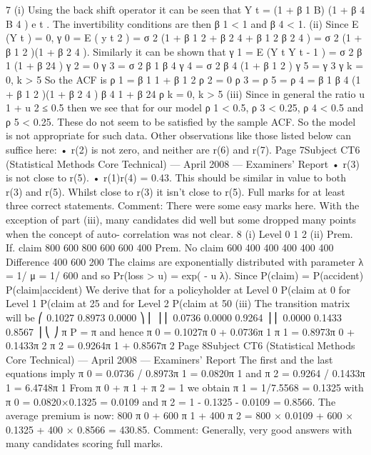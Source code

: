 7
(i)
Using the back shift operator it can be seen that
Y t = (1 + β 1 B) (1 + β 4 B 4 ) e t .
The invertibility conditions are then β 1 < 1 and β 4 < 1.
(ii)
Since E (Y t ) = 0, γ 0 = E ( y t 2 ) = σ 2 (1 + β 1 2 + β 2 4 + β 1 2 β 2 4 ) = σ 2 (1 + β 1 2 )(1 + β 2 4 ).
Similarly it can be shown that
γ 1 = E (Y t Y t - 1 ) = σ 2 β 1 (1 + β 24 )
γ 2 = 0
γ 3 = σ 2 β 1 β 4
γ 4 = σ 2 β 4 (1 + β 1 2 )
γ 5 = γ 3
γ k = 0, k > 5
So the ACF is
ρ 1 =
β 1
1 + β 1 2
ρ 2 = 0
ρ 3 = ρ 5 =
ρ 4 =
β 1 β 4
(1 + β 1 2 )(1 + β 2 4 )
β 4
1 + β 24
ρ k = 0, k > 5
(iii)
Since in general the ratio
u
1 + u 2
≤ 0.5 then we see that for our model
ρ 1 < 0.5, ρ 3 < 0.25, ρ 4 < 0.5 and ρ 5 < 0.25. These do not seem to be
satisfied by the sample ACF. So the model is not appropriate for such data.
Other observations like those listed below can suffice here:
•
r(2) is not zero, and neither are r(6) and r(7).
Page 7Subject CT6 (Statistical Methods Core Technical) — April 2008 — Examiners’ Report
• r(3) is not close to r(5).
• r(1)r(4) = 0.43. This should be similar in value to both r(3) and r(5).
Whilst close to r(3) it isn't close to r(5).
Full marks for at least three correct statements.
Comment: There were some easy marks here. With the exception of part (iii), many
candidates did well but some dropped many points when the concept of auto-
correlation was not clear.
8
(i)
Level
0
1
2
(ii)
Prem. If. claim
800 600
800 600
600 400
Prem. No claim
600 400
400 400
400 400
Difference
400
600
200
The claims are exponentially distributed with parameter λ = 1/ μ = 1/ 600 and
so Pr(loss > u) = exp( - u λ).
Since
P(claim) = P(accident) P(claim|accident)
We derive that for a policyholder at Level 0
P(claim at 0%
for Level 1
P(claim at 25%
and for Level 2
P(claim at 50%
(iii)
The transition matrix will be
⎛ 0.1027 0.8973 0.0000 ⎞
⎜
⎟
⎜ 0.0736 0.0000 0.9264 ⎟
⎜ 0.0000 0.1433 0.8567 ⎟
⎝
⎠
π P = π and hence
π 0 = 0.1027π 0 + 0.0736π 1
π 1 = 0.8973π 0 + 0.1433π 2
π 2 = 0.9264π 1 + 0.8567π 2
Page 8Subject CT6 (Statistical Methods Core Technical) — April 2008 — Examiners’ Report
The first and the last equations imply
π 0 = 0.0736 / 0.8973π 1 = 0.0820π 1
and
π 2 = 0.9264 / 0.1433π 1 = 6.4748π 1
From π 0 + π 1 + π 2 = 1 we obtain π 1 = 1/7.5568 = 0.1325
with π 0 = 0.0820×0.1325 = 0.0109 and π 2 = 1 - 0.1325 - 0.0109 = 0.8566.
The average premium is now:
800 π 0 + 600 π 1 + 400 π 2 = 800 × 0.0109 + 600 × 0.1325 + 400 × 0.8566 =
430.85.
Comment: Generally, very good answers with many candidates scoring full marks.
